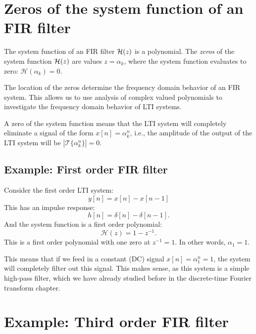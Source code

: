 \section{Zeros of the system function of an FIR filter}
The system function of an FIR filter $\mathcal{H}(z)$ is a polynomial. The
\emph{zeros} of the system function $\mathcal{H}(z)$ are values $z=\alpha_k$, where
the system function evaluates to zero: $\mathcal{H}(\alpha_k) = 0$.

The location of the zeros determine the frequency domain behavior of
an FIR system. This allows us to use analysis of complex valued polynomials
to investigate the frequency domain behavior of LTI systems.

A zero of the system function means that the LTI system will
completely eliminate a signal of the form $x[n]=\alpha_k^{n}$, i.e.,
the amplitude of the output of the LTI system will be
$|\mathcal{T}\{\alpha_k^{n}\}|=0$.

\subsection{Example: First order FIR filter}

Consider the first order LTI system:
\begin{equation}
  y[n] = x[n] - x[n-1]
\end{equation}
This has an impulse response:
\begin{equation}
  h[n] = \delta[n] - \delta[n-1].
\end{equation}
And the system function is a first order polynomial:
\begin{equation}
  \mathcal{H}(z) = 1-z^{-1}.
\end{equation}
This is a first order polynomial with one zero at $z^{-1}=1$. In other
words, $\alpha_1=1$.

This means that if we feed in a constant (DC) signal $x[n]=\alpha_1^{n}=1$, the
system will completely filter out this signal. This makes sense, as
this system is a simple high-pass filter, which we have already
studied before in the discrete-time Fourier transform chapter. 

\section{Example: Third order FIR filter}

